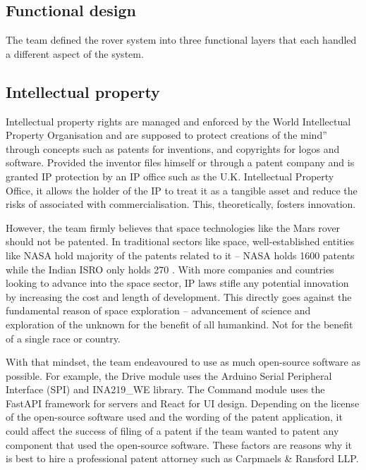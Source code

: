 \documentclass[11pt, a4paper]{article}
\begin{document}
\pagebreak
\subsection{Functional design}

The team defined the rover system into three functional layers that each handled a different aspect of the system. 



\pagebreak
\subsection{Intellectual property}

Intellectual property rights are managed and enforced by the World Intellectual Property Organisation and are supposed to protect creations of the mind” through concepts such as patents for inventions, and copyrights for logos and software. Provided the inventor files himself or through a patent company and is granted IP protection by an IP office such as the U.K. Intellectual Property Office, it allows the holder of the IP to treat it as a tangible asset and reduce the risks of associated with commercialisation. This, theoretically, fosters innovation.

However, the team firmly believes that space technologies like the Mars rover should not be patented. In traditional sectors like space, well-established entities like NASA hold majority of the patents related to it – NASA holds 1600\cite{NASA_patents} patents while the Indian ISRO only holds 270 \cite{ISRO_patents}. With more companies and countries looking to advance into the space sector, IP laws stifle any potential innovation by increasing the cost and length of development. This directly goes against the fundamental reason of space exploration – advancement of science and exploration of the unknown for the benefit of all humankind. Not for the benefit of a single race or country.

With that mindset, the team endeavoured to use as much open-source software as possible. For example, the Drive module uses the Arduino  Serial Peripheral Interface (SPI) and INA219\_WE library. The Command module uses the FastAPI framework for servers and React for UI design. Depending on the license of the open-source software used and the wording of the patent application, it could affect the success of filing of a patent if the team wanted to patent any component that used the open-source software. These factors are reasons why it is best to hire a professional patent attorney such as Carpmaels \& Ransford LLP.  
 
\end{document}
